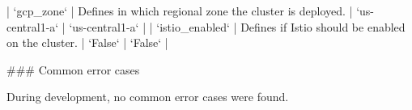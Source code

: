 | `gcp_zone`                   | Defines in which regional zone the cluster is deployed.                                                                                                                                            | `us-central1-a`         | `us-central1-a`         |
| `istio_enabled`              | Defines if Istio should be enabled on the cluster.                                                                                                                                                        | `False`                 | `False`                 |

### Common error cases

During development, no common error cases were found.
